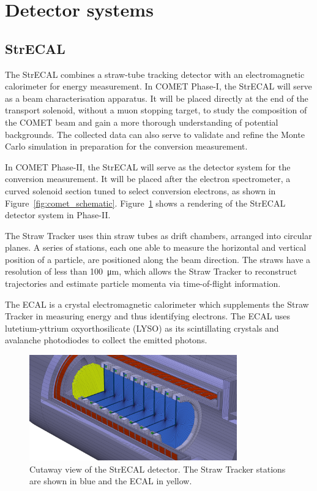 \section{Detector systems}
\subsection{StrECAL}
The StrECAL combines a straw-tube tracking detector with an electromagnetic
calorimeter for energy measurement. In COMET Phase-I, the StrECAL will serve as
a beam characterisation apparatus. It will be placed directly at the end of the
transport solenoid, without a muon stopping target, to study the composition of
the COMET beam and gain a more thorough understanding of potential backgrounds.
The collected data can also serve to validate and refine the Monte Carlo
simulation in preparation for the conversion measurement.

In COMET Phase-II, the StrECAL will serve as the detector system for the
conversion measurement. It will be placed after the electron spectrometer, a
curved solenoid section tuned to select conversion electrons, as shown in
Figure~\ref{fig:comet_schematic}. Figure~\ref{fig:strecal} shows a rendering of
the StrECAL detector system in Phase-II.

The Straw Tracker uses thin straw tubes as drift chambers, arranged into
circular planes. A series of stations, each one able to measure the horizontal
and vertical position of a particle, are positioned along the beam direction.
The straws have a resolution of less than \SI{100}{\um}, which allows the Straw
Tracker to reconstruct trajectories and estimate particle momenta via
time-of-flight information.

The ECAL is a crystal electromagnetic calorimeter which supplements the Straw
Tracker in measuring energy and thus identifying electrons. The ECAL uses
lutetium-yttrium oxyorthosilicate (LYSO) as its scintillating crystals and
avalanche photodiodes to collect the emitted photons.


\begin{figure}
    \centering
    \includegraphics[width=0.8\textwidth]{chapter2/strecal_recolor.png}
    \caption{ Cutaway view of the StrECAL detector. The Straw Tracker stations
    are shown in blue and the ECAL in yellow.  }
    \label{fig:strecal}
\end{figure}

